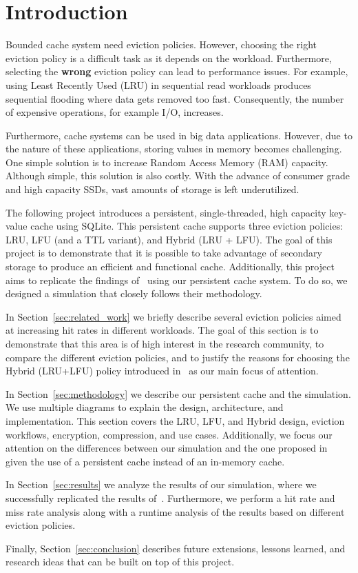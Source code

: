 \section{Introduction}
Bounded cache system need eviction policies. However, choosing the right eviction policy
is a difficult task as it depends on the workload. Furthermore, selecting
the \textbf{wrong} eviction policy can lead to performance issues. For example,
using Least Recently Used (LRU) in sequential read workloads produces
sequential flooding where data gets removed too fast. Consequently,
the number of
expensive operations, for example I/O, increases.

Furthermore, cache systems can be used in big data applications.
However, due to the nature of these applications, storing values
in memory becomes challenging. One simple solution
is to increase Random Access Memory (RAM) capacity. Although simple,
this solution is also costly. With the advance of consumer grade
and high capacity SSDs, vast amounts of storage is left underutilized.

The following project introduces a persistent,
single-threaded, high capacity key-value cache using SQLite.
This persistent cache supports three eviction policies:
LRU, LFU (and a TTL variant), and Hybrid (LRU + LFU).
The goal of this project is to demonstrate that it is possible
to take advantage of secondary storage to produce an efficient
and functional cache. Additionally, this project
aims to replicate the findings of~\cite{shah2023ImprovedCacheEviction}
using our persistent cache system. To do so, we designed a simulation
that closely follows their methodology.

In Section~\ref{sec:related_work} we briefly describe several eviction
policies aimed at increasing hit rates in different workloads.
The goal of this section is to demonstrate that this area
is of high interest in the research community, to compare
the different eviction policies, and to justify the reasons
for choosing the Hybrid (LRU+LFU) policy
introduced in~\cite{shah2023ImprovedCacheEviction} as
our main focus of attention.

In Section~\ref{sec:methodology} we describe our persistent
cache and the simulation.
We use multiple diagrams to explain the design,
architecture, and implementation. This section
covers the LRU, LFU, and Hybrid design,
eviction workflows, encryption, compression,
and use cases. Additionally, we focus our attention
on the differences between our simulation and the one
proposed in~\cite{shah2023ImprovedCacheEviction}
given the use of a persistent cache instead of
an in-memory cache.

In Section~\ref{sec:results} we analyze the
results of our simulation, where we successfully
replicated the results of~\cite{shah2023ImprovedCacheEviction}.
Furthermore, we perform a hit rate and miss rate analysis
along with a runtime analysis of the results
based on different eviction policies.

Finally, Section~\ref{sec:conclusion}
describes future extensions, lessons learned,
and research ideas that can be built on top of this project.